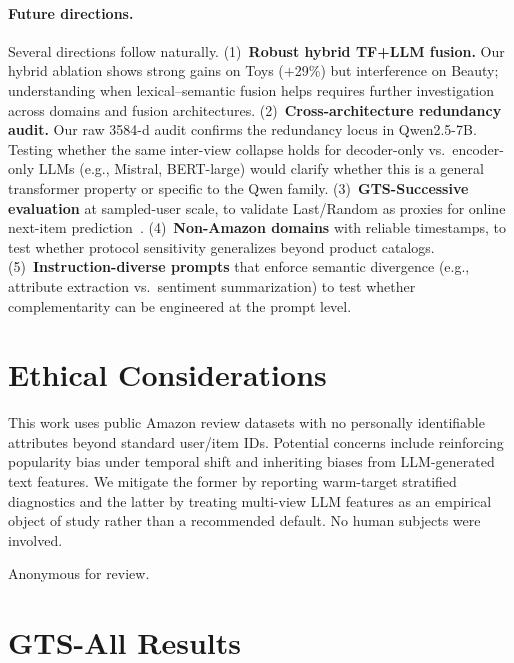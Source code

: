 \documentclass[sigconf,natbib=true,anonymous]{acmart}
\begin{document}
\paragraph{Future directions.}
Several directions follow naturally.
(1)~\textbf{Robust hybrid TF+LLM fusion.}  Our hybrid ablation shows strong gains on Toys ($+$29\%) but interference on Beauty; understanding when lexical--semantic fusion helps requires further investigation across domains and fusion architectures.
(2)~\textbf{Cross-architecture redundancy audit.}  Our raw 3584-d audit confirms the redundancy locus in Qwen2.5-7B.  Testing whether the same inter-view collapse holds for decoder-only vs.\ encoder-only LLMs (e.g., Mistral, BERT-large) would clarify whether this is a general transformer property or specific to the Qwen family.
(3)~\textbf{GTS-Successive evaluation} at sampled-user scale, to validate Last/Random as proxies for online next-item prediction~\cite{liang2024timetosplit}.
(4)~\textbf{Non-Amazon domains} with reliable timestamps, to test whether protocol sensitivity generalizes beyond product catalogs.
(5)~\textbf{Instruction-diverse prompts} that enforce semantic divergence (e.g., attribute extraction vs.\ sentiment summarization) to test whether complementarity can be engineered at the prompt level.

\section*{Ethical Considerations}
This work uses public Amazon review datasets with no personally identifiable attributes beyond standard user/item IDs.
Potential concerns include reinforcing popularity bias under temporal shift and inheriting biases from LLM-generated text features.
We mitigate the former by reporting warm-target stratified diagnostics and the latter by treating multi-view LLM features as an empirical object of study rather than a recommended default.
No human subjects were involved.

\begin{acks}
Anonymous for review.
\end{acks}

\appendix

\section{GTS-All Results}
\label{app:gts-all}
\end{document}
